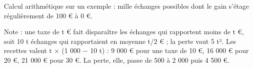 Calcul arithmétique sur un exemple : mille échanges possibles dont le gain s'étage régulièrement de 100 \euro{} à 0 \euro{}.\par Note : une taxe de t \euro{} fait disparaître les échanges qui rapportent moins de t \euro{}, soit 10 t échanges qui rapportaient en moyenne t/2 \euro{} ; la perte vaut 5 t². Les recettes valent t $\times$ (1 000 $-$ 10 t) : 9 000 \euro{} pour une taxe de 10 \euro{}, 16 000 \euro{} pour 20 \euro{}, 21 000 \euro{} pour 30 \euro{}. La perte, elle, passe de 500 à 2 000 puis 4 500 \euro{}.
